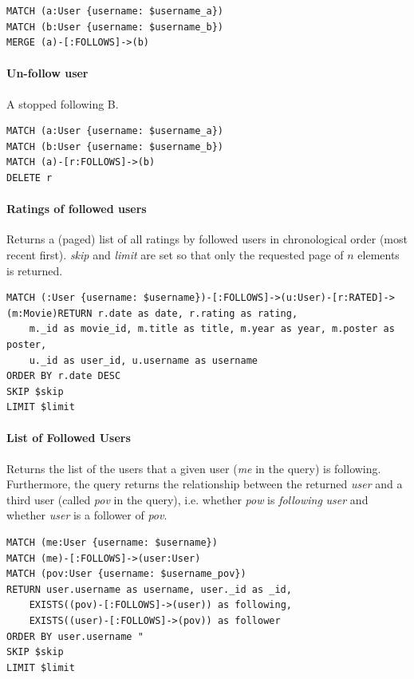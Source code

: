 \documentclass[11pt]{article}
\begin{document}
\begin{lstlisting}[language=Cypher]
MATCH (a:User {username: $username_a})
MATCH (b:User {username: $username_b})
MERGE (a)-[:FOLLOWS]->(b)
\end{lstlisting}

\paragraph{Un-follow user} A stopped following B.

\begin{lstlisting}[language=Cypher]
MATCH (a:User {username: $username_a})
MATCH (b:User {username: $username_b})
MATCH (a)-[r:FOLLOWS]->(b)
DELETE r
\end{lstlisting}

\paragraph{Ratings of followed users} Returns a (paged) list of all ratings by followed users in chronological order (most recent first). \emph{skip} and \emph{limit} are set so that only the requested page of $n$ elements is returned.

\begin{lstlisting}[language=Cypher]
MATCH (:User {username: $username})-[:FOLLOWS]->(u:User)-[r:RATED]->(m:Movie)RETURN r.date as date, r.rating as rating,
    m._id as movie_id, m.title as title, m.year as year, m.poster as poster,
    u._id as user_id, u.username as username
ORDER BY r.date DESC
SKIP $skip
LIMIT $limit
\end{lstlisting}

\paragraph{List of Followed Users} Returns the list of the users that a given user (\emph{me} in the query) is following. Furthermore, the query returns the relationship between the returned \emph{user} and a third user (called \emph{pov} in the query), i.e. whether \emph{pow} is \emph{following} \emph{user} and whether \emph{user} is a follower of \emph{pov}. 

\begin{lstlisting}[language=Cypher]
MATCH (me:User {username: $username})
MATCH (me)-[:FOLLOWS]->(user:User)
MATCH (pov:User {username: $username_pov})
RETURN user.username as username, user._id as _id,
    EXISTS((pov)-[:FOLLOWS]->(user)) as following,
    EXISTS((user)-[:FOLLOWS]->(pov)) as follower
ORDER BY user.username "
SKIP $skip
LIMIT $limit
\end{lstlisting}
\end{document}
